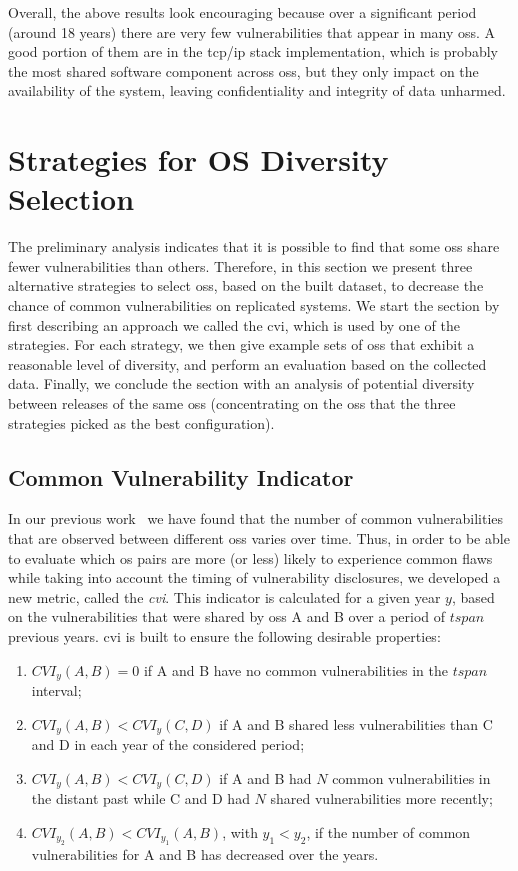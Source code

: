 Overall, the above results look encouraging because over a significant period (around 18 years) there are very few vulnerabilities that appear in many \glspl{os}. 
A good portion of them are in the \gls{tcp}/\gls{ip} stack implementation, which is probably the most shared software component across \glspl{os}, but they only impact on the availability of the system, leaving confidentiality and integrity of data unharmed.


\section{Strategies for OS Diversity Selection}\label{evaluation}
The preliminary analysis indicates that it is possible to find that some \glspl{os} share fewer vulnerabilities than others. 
Therefore, in this section we present three alternative strategies to select \glspl{os}, based on the built dataset, to decrease the chance of common vulnerabilities on replicated systems. 
We start the section by first describing an approach we called the \gls{cvi}, which is used by one of the strategies. 
For each strategy, we then give example sets of \glspl{os} that exhibit a reasonable level of diversity, and perform an evaluation based on the collected data. 
Finally, we conclude the section with an analysis of potential diversity between releases of the same \glspl{os} (concentrating on the \glspl{os} that the three strategies picked as the best configuration).


\subsection{Common Vulnerability Indicator}\label{cvi}
In our previous work~\cite{Garcia:2012} we have found that the number of common vulnerabilities that are observed between different \glspl{os} varies over time. 
Thus, in order to be able to evaluate which \gls{os} pairs are more (or less) likely to experience common flaws while taking into account the timing of vulnerability disclosures, we developed a new metric, called the \emph{\gls{cvi}}. 
This indicator is calculated for a given year $y$, based on the vulnerabilities that were shared by \glspl{os} A and B over a period of $\mathit{tspan}$ previous years. \gls{cvi} is built to ensure the following desirable properties:
\begin{enumerate}
\newcommand{\OLDtheenumi}{\theenumi}
\renewcommand{\theenumi}{\roman{enumi}}
\item $\mathit{CVI}_y(A,B) = 0$ if A and B have no common vulnerabilities in the $\mathit{tspan}$ interval;
\item $\mathit{CVI}_y(A,B) < \mathit{CVI}_y(C,D)$ if A and B shared less vulnerabilities than C and D in each year of the considered period;
\item $\mathit{CVI}_y(A,B) < \mathit{CVI}_y(C,D)$ if A and B had $N$ common vulnerabilities in the distant past while C and D had $N$ shared vulnerabilities more recently;
\item $\mathit{CVI}_{y_2}(A,B) < \mathit{CVI}_{y_1}(A,B)$, with $y_1 < y_2$, if the number of common vulnerabilities for A and B has decreased over the years.
\renewcommand{\theenumi}{\OLDtheenumi}
\end{enumerate}

